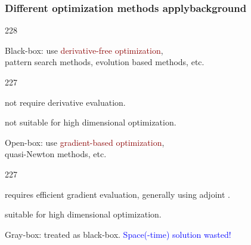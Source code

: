 \documentclass{beamer}
\let\oldcite=\cite
\renewcommand{\cite}[1]{\textcolor[rgb]{.4,.4,.85}{\oldcite{#1}}}
\newcommand{\barrow}{\item[\color{darkred}\ding{228}]}
\newcommand{\carrow}{\item[\color{darkred}\ding{227}]}
\begin{document}
\begin{frame}
    \frametitle{Different optimization methods apply\hfill \scriptsize{background}}\small
    \begin{dinglist}{228}
        \barrow {Black-box}: use \textcolor{darkred}{derivative-free optimization},\\
                \scriptsize{
                pattern search methods, evolution based methods, etc.}
                \small
                \begin{dinglist}{227}
                    \carrow not require derivative evaluation.
                    \vspace{.15cm}
                    \carrow not suitable for high dimensional optimization.
                \end{dinglist}

                \vspace{.15cm}
        \barrow Open-box: use \textcolor{darkred}{gradient-based optimization},\\
                \scriptsize
                quasi-Newton methods, etc. %
                \small
                \begin{dinglist}{227}
                    \carrow requires efficient gradient evaluation, generally using adjoint 
                    \scriptsize \cite{Lions 71} \small.
                    \vspace{.15cm}
                    \carrow suitable for high dimensional optimization.
                \end{dinglist}

                \vspace{.15cm}
        \barrow Gray-box: treated as black-box. 
                \textcolor{blue}{Space(-time) solution wasted!}
    \end{dinglist}
\end{frame}
\end{document}
